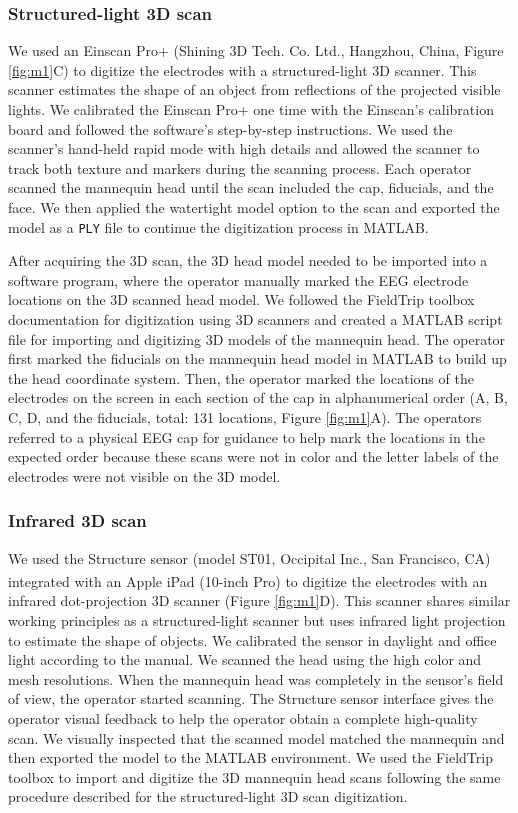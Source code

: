 \documentclass{UCF_ETD}
\newcommand{\tss}[1]{\textsuperscript{#1}}
\begin{document}
\subsubsection{Structured-light 3D scan}
We used an Einscan Pro+ (Shining 3D Tech. Co. Ltd., Hangzhou, China, Figure \ref{fig:m1}C) to digitize the electrodes with a structured-light 3D scanner. This scanner estimates the shape of an object from reflections of the projected visible lights. We calibrated the Einscan Pro+ one time with the Einscan's calibration board and followed the software's step-by-step instructions. We used the scanner's hand-held rapid mode with high details and allowed the scanner to track both texture and markers during the scanning process. Each operator scanned the mannequin head until the scan included the cap, fiducials, and the face. We then applied the watertight model option to the scan and exported the model as a {\tt PLY} file to continue the digitization process in MATLAB.

After acquiring the 3D scan, the 3D head model needed to be imported into a software program, where the operator manually marked the EEG electrode locations on the 3D scanned head model. We followed the FieldTrip toolbox documentation for digitization using 3D scanners \citep{ft_scan_tut} and created a MATLAB script file for importing and digitizing 3D models of the mannequin head. The operator first marked the fiducials on the mannequin head model in MATLAB to build up the head coordinate system. Then, the operator marked the locations of the electrodes on the screen in each section of the cap in alphanumerical order (A, B, C, D, and the fiducials, total: 131 locations, Figure \ref{fig:m1}A). The operators referred to a physical EEG cap for guidance to help mark the locations in the expected order because these scans were not in color and the letter labels of the electrodes were not visible on the 3D model.

\subsubsection{Infrared 3D scan}
We used the Structure sensor (model ST01, Occipital Inc., San Francisco, CA) integrated with an Apple\tss{\textregistered} iPad (10-inch Pro) to digitize the electrodes with an infrared dot-projection 3D scanner (Figure \ref{fig:m1}D). This scanner shares similar working principles as a structured-light scanner but uses infrared light projection to estimate the shape of objects. We calibrated the sensor in daylight and office light according to the manual. We scanned the head using the high color and mesh resolutions. When the mannequin head was completely in the sensor's field of view, the operator started scanning. The Structure sensor interface gives the operator visual feedback to help the operator obtain a complete high-quality scan. We visually inspected that the scanned model matched the mannequin and then exported the model to the MATLAB environment. We used the FieldTrip toolbox to import and digitize the 3D mannequin head scans following the same procedure described for the structured-light 3D scan digitization. 
\end{document}
